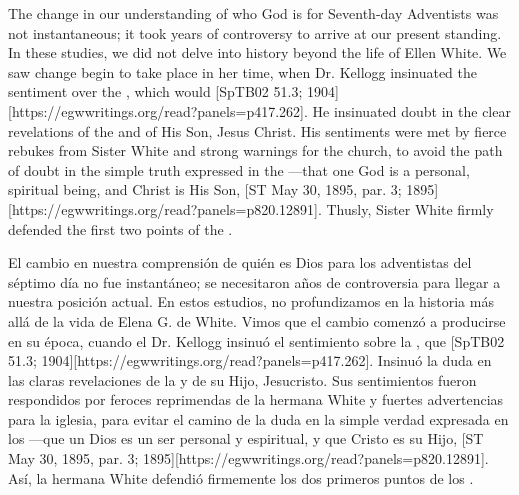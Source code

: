 The change in our understanding of who God is for Seventh-day Adventists was not instantaneous; it took years of controversy to arrive at our present standing. In these studies, we did not delve into history beyond the life of Ellen White. We saw change begin to take place in her time, when Dr. Kellogg insinuated the sentiment over the , which would [SpTB02 51.3; 1904][https://egwwritings.org/read?panels=p417.262]. He insinuated doubt in the clear revelations of the  and of His Son, Jesus Christ. His sentiments were met by fierce rebukes from Sister White and strong warnings for the church, to avoid the path of doubt in the simple truth expressed in the —that one God is a personal, spiritual being, and Christ is His Son, [ST May 30, 1895, par. 3; 1895][https://egwwritings.org/read?panels=p820.12891]. Thusly, Sister White firmly defended the first two points of the .


El cambio en nuestra comprensión de quién es Dios para los adventistas del séptimo día no fue instantáneo; se necesitaron años de controversia para llegar a nuestra posición actual. En estos estudios, no profundizamos en la historia más allá de la vida de Elena G. de White. Vimos que el cambio comenzó a producirse en su época, cuando el Dr. Kellogg insinuó el sentimiento sobre la , que [SpTB02 51.3; 1904][https://egwwritings.org/read?panels=p417.262]. Insinuó la duda en las claras revelaciones de la  y de su Hijo, Jesucristo. Sus sentimientos fueron respondidos por feroces reprimendas de la hermana White y fuertes advertencias para la iglesia, para evitar el camino de la duda en la simple verdad expresada en los —que un Dios es un ser personal y espiritual, y que Cristo es su Hijo, [ST May 30, 1895, par. 3; 1895][https://egwwritings.org/read?panels=p820.12891]. Así, la hermana White defendió firmemente los dos primeros puntos de los .


